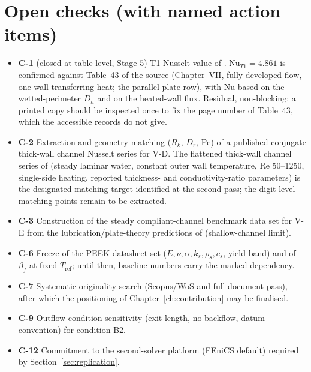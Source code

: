 \section{Open checks (with named action items)}
\begin{itemize}\itemsep1pt
\item \textbf{C-1} (closed at table level, Stage 5) T1 Nusselt value of \cite{shah1978laminar}.
$\mathrm{Nu}_{T1}=4.861$ is confirmed against Table~43 of the source (Chapter~VII, fully developed
flow, one wall transferring heat; the parallel-plate row), with $\mathrm{Nu}$ based on the
wetted-perimeter $D_h$ and on the heated-wall flux. Residual, non-blocking: a printed copy should be
inspected once to fix the page number of Table~43, which the accessible records do not give.
\item \textbf{C-2} Extraction and geometry matching ($R_k$, $D_r$, $\mathrm{Pe}$) of a published
conjugate thick-wall channel Nusselt series for V-D. The flattened thick-wall channel series of
\cite{rahimi2024conjugate} (steady laminar water, constant outer wall temperature, Re 50--1250,
single-side heating, reported thickness- and conductivity-ratio parameters) is the designated
matching target identified at the second pass; the digit-level matching points remain to be
extracted.
\item \textbf{C-3} Construction of the steady compliant-channel benchmark data set for V-E from the
lubrication/plate-theory predictions of \cite{christov2018flow} (shallow-channel limit).
\item \textbf{C-6} Freeze of the PEEK datasheet set ($E,\nu,\alpha,k_s,\rho_s,c_s$, yield band) and
of $\beta_f$ at fixed $T_{\mathrm{ref}}$; until then, baseline numbers carry the marked dependency.
\item \textbf{C-7} Systematic originality search (Scopus/WoS and full-document pass), after which
the positioning of Chapter~\ref{ch:contribution} may be finalised.
\item \textbf{C-9} Outflow-condition sensitivity (exit length, no-backflow, datum convention) for
condition B2.
\item \textbf{C-12} Commitment to the second-solver platform (FEniCS default) required by
Section~\ref{sec:replication}.
\end{itemize}


